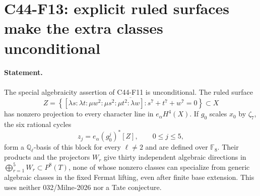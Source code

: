 \documentclass[11pt]{article}
\theoremstyle{remark}\newtheorem{remark}[theorem]{Remark}
\begin{document}
\section{C44-F13: explicit ruled surfaces make the extra classes unconditional}
\label{sec:C44-F13}
\paragraph{Statement.}
The special algebraicity assertion of C44-F11 is unconditional.
The ruled surface
\[
 Z=\overline{\left\{
 [\lambda s:\lambda t:\mu w^2:\mu s^2:\mu t^2:\lambda w]:
 s^7+t^7+w^7=0
 \right\}}\subset X
\]
has nonzero projection to every character line in \(e_\alpha H^4(X)\).
If \(g_0\) scales \(x_0\) by \(\zeta _7\), the six rational cycles
\[
 z_j=e_\alpha(g_0^j)^*[Z],\qquad 0\le j\le5,
\]
form a \(\mathbb Q_\ell\)-basis of this block for every \(\ell\ne2\)
and are defined over \(\mathbb F _8\). Their products and the
projectors \(W_r\) give thirty independent algebraic directions in
\(\bigoplus_{r=1}^5W_r\subset P^8(T)\), none of whose nonzero classes
can specialize from generic algebraic classes in the fixed Fermat
lifting, even after finite base extension. This uses neither
032/Milne-2026 nor a Tate conjecture.
\end{document}
